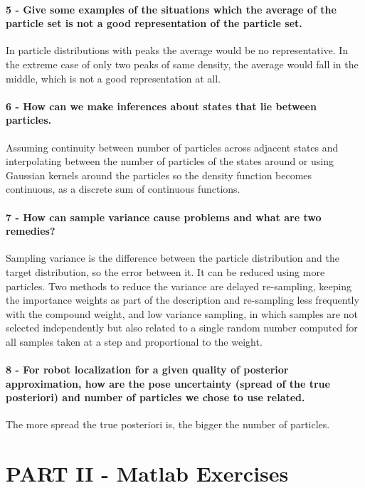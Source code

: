 \documentclass[12pt]{article}
\begin{document}
\paragraph{5 - Give some examples of the situations which the average of the particle set is not a good representation of the particle set.}
In particle distributions with peaks the average would be no representative. In the extreme case of only two peaks of same density, the average would fall in the middle, which is not a good representation at all.

\paragraph{6 - How can we make inferences about states that lie between particles.}
Assuming continuity between number of particles across adjacent states and interpolating between the number of particles of the states around or using Gaussian kernels around the particles so the density function becomes continuous, as a discrete sum of continuous functions.


\paragraph{7 - How can sample variance cause problems and what are two remedies?}
Sampling variance is the difference between the particle distribution and the target distribution, so the error between it. It can be reduced using more particles. Two methods to reduce the variance are delayed re-sampling, keeping the importance weights as part of the description and re-sampling less frequently with the compound weight, and low variance sampling, in which samples are not selected independently but also related to a single random number computed for all samples taken at a step and proportional to the weight.

\paragraph{8 - For robot localization for a given quality of posterior approximation, how are the pose uncertainty (spread of the true posteriori) and number of particles we chose to use related.}
The more spread the true posteriori is, the bigger the number of particles.



\section{PART II - Matlab Exercises}
\end{document}
